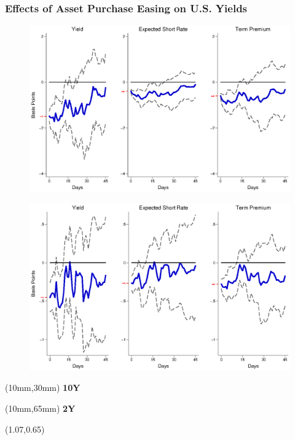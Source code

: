 \documentclass[12pt, aspectratio=169, xcolor=dvipsnames]{beamer}
\begin{document}
\begin{frame}[label=LSAPUS]
\frametitle{Effects of Asset Purchase Easing on U.S. Yields}
\begin{figure}[!htbp]
\begin{center} %
\includegraphics[trim={0cm 0cm 0cm 0cm},clip,height=0.45\textheight,width=0.85\linewidth]{../Figures/LPs/LagDep-FX/LSAP/US/LSAPUSDnomyptp120m.eps}
\par\end{center}
\end{figure}
\vspace{-0.5cm}
\begin{figure}[!htbp]
\begin{center} %
\includegraphics[trim={0cm 0cm 0cm 0.76cm},clip,height=0.45\textheight,width=0.85\linewidth]{../Figures/LPs/LagDep-FX/LSAP/US/LSAPUSDnomyptp24m.eps}
\par\end{center}
\end{figure}
\begin{textblock*}{8mm}(10mm,30mm)
\small \textbf{10Y}
\end{textblock*}
\begin{textblock*}{8mm}(10mm,65mm)
\small \textbf{2Y}
\end{textblock*}
\begin{textblock*}{5cm}(1.07\textwidth,0.65\textheight)
\hyperlink{LSAPEM}{}
\end{textblock*}
\end{frame}
\end{document}
